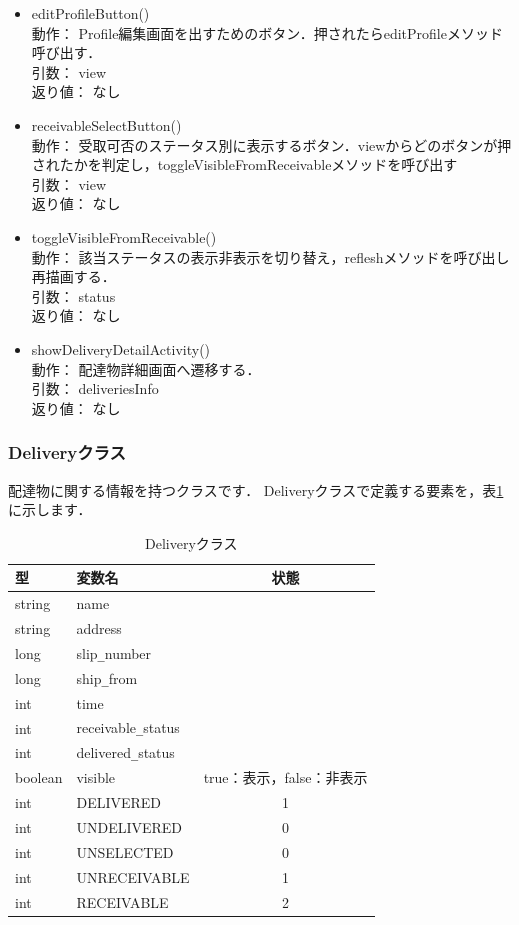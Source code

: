 \documentclass[a4j,titlepage]{jarticle}
\begin{document}
\begin{itemize}
  \item editProfileButton()\\
  動作：  Profile編集画面を出すためのボタン．押されたらeditProfileメソッド呼び出す．\\
  引数：  view\\
  返り値：  なし

  \item receivableSelectButton()\\
  動作：  受取可否のステータス別に表示するボタン．viewからどのボタンが押されたかを判定し，toggleVisibleFromReceivableメソッドを呼び出す\\
  引数：  view\\
  返り値：  なし

  \item toggleVisibleFromReceivable()\\
  動作：  該当ステータスの表示非表示を切り替え，refleshメソッドを呼び出し再描画する．\\
  引数：  status\\
  返り値：  なし

  \item showDeliveryDetailActivity()\\
  動作：  配達物詳細画面へ遷移する．\\
  引数：  deliveriesInfo\\
  返り値：  なし
\end{itemize}

\subsubsection{Deliveryクラス}
配達物に関する情報を持つクラスです．
Deliveryクラスで定義する要素を，表\ref{deliveryTable}に示します．\\
\begin{table}[htb]
\centering
\caption{Deliveryクラス}
\label{deliveryTable}
\begin{tabular}{|llc|}
\hline
型 & 変数名 & 状態      \\ \hline
string  & name  &      \\
string & address &      \\
long  &  slip\verb|_|number  &    \\
long & ship\verb|_|from &      \\
int & time &      \\
int & receivable\verb|_|status &     \\
int & delivered\verb|_|status  &    \\
boolean & visible  &  true：表示，false：非表示    \\
int & DELIVERED  &  1  \\
int & UNDELIVERED  & 0   \\
int & UNSELECTED  &  0  \\
int & UNRECEIVABLE  & 1   \\
int & RECEIVABLE  & 2   \\\hline
\end{tabular}
\end{table}
\clearpage
\end{document}
